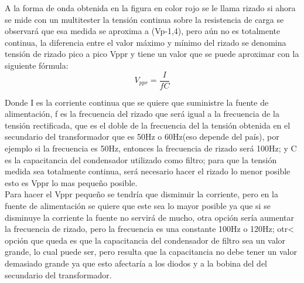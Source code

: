 \documentclass{article}
\begin{document}
A la forma de onda obtenida en la figura en color rojo se le llama rizado si ahora se mide con un multitester la tensión continua sobre la resistencia de carga se observará que esa medida se aproxima a (Vp-1,4), pero aún no es totalmente continua, la diferencia entre el valor máximo y mínimo del rizado se denomina tensión de rizado pico a pico Vppr y tiene un valor que se puede aproximar con la siguiente fórmula:\citep{FiltroParaCorrienteAlterna}\\

\begin{equation}
    V_{ppr}=\frac{I}{fC}
\end{equation}

Donde I es la corriente continua que se quiere que suministre la fuente de alimentación, f es la frecuencia del rizado que será igual a la frecuencia de la tensión rectificada, que es el doble de la frecuencia del la tensión obtenida en el secundario del transformador que es 50Hz o 60Hz(eso depende del país), por ejemplo si la frecuencia es 50Hz, entonces la frecuencia de rizado será 100Hz; y C es la capacitancia del condensador utilizado como filtro; para que la tensión medida sea totalmente continua, será necesario hacer el rizado lo menor posible esto es  Vppr lo mas pequeño posible.\citep{FiltroParaCorrienteAlterna}\\

Para hacer el Vppr pequeño se tendría que disminuir la corriente, pero en la fuente de alimentación se quiere que este sea lo mayor posible ya que si se disminuye la corriente la fuente no servirá de mucho, otra opción sería aumentar la frecuencia de rizado, pero la frecuencia es una constante 100Hz o 120Hz; otr< opción que queda es que la capacitancia del condensador de filtro sea un valor grande, lo  cual puede ser, pero resulta que la capacitancia no debe tener un valor demasiado grande ya que esto afectaría a los diodos y a la bobina del del secundario del transformador.\citep{FiltroParaCorrienteAlterna}





\end{document}
